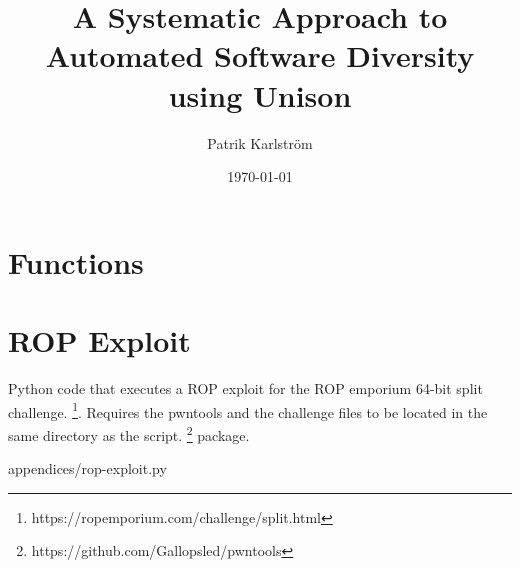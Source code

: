 \documentclass{kththesis}
\title{A Systematic Approach to Automated Software Diversity using Unison}
\author{Patrik Karlström}
\date{\today}
\begin{document}
\frontmatter

\titlepage






\tableofcontents


\mainmatter









\printbibliography[heading=bibintoc] %

\appendix

\chapter{Functions}
\label{appendix:function_names}


\chapter{ROP Exploit}
\label{appendix:rop-exploit}

Python code that executes a ROP exploit for the ROP emporium 64-bit split challenge.
\footnote{https://ropemporium.com/challenge/split.html}. Requires the pwntools and the
challenge files to be located in the same directory as the script.
\footnote{https://github.com/Gallopsled/pwntools} package.


{appendices/rop-exploit.py}
\end{document}
